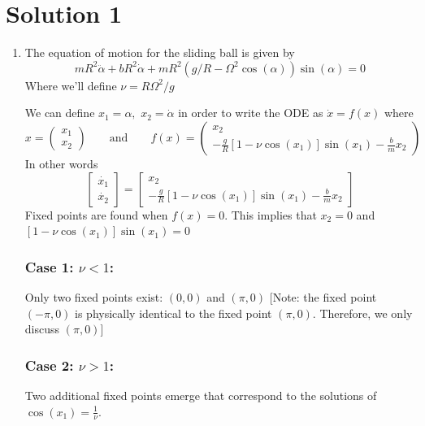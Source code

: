 \documentclass[twoside,10pt,a4paper]{article}
\begin{document}
\section*{Solution 1}
\begin{enumerate}[label=(\alph*)]
\item The equation of motion for the sliding ball is given by
\begin{equation*}
	mR^2 \ddot{\alpha} + bR^2 \dot{\alpha} + mR^2(g/R - \Omega^2 \cos (\alpha))\sin (\alpha) = 0
\end{equation*}
Where we'll define $\nu = R\Omega^2 /g$

We can define $x_1 = \alpha, \,\, x_2 = \dot{\alpha}$ in order to write the ODE as $\dot{x} = f(x)$ where
\begin{equation*}
	x = \begin{pmatrix}
		x_1 \\
		x_2
	\end{pmatrix}
	\qquad \text{and} \qquad f(x) = \begin{pmatrix}
		x_2 \\
		-\displaystyle \frac{g}{R}[1-\nu \cos (x_1)]\sin (x_1) - \frac{b}{m} x_2
	\end{pmatrix}
\end{equation*}
In other words
\begin{equation*}
	\begin{bmatrix}
		\dot{x_1} \\
		\dot{x_2}
	\end{bmatrix} = \begin{bmatrix}
		x_2 \\
		-\displaystyle \frac{g}{R}[1-\nu \cos (x_1)]\sin (x_1) - \frac{b}{m} x_2
	\end{bmatrix}
\end{equation*}
Fixed points are found when $f(x)=0$. This implies that $ x_2 =0$ and $[1-\nu \cos (x_1)]\sin (x_1)=0$

\subsubsection*{Case 1: $\nu <1$:}
Only two fixed points exist: $(0,0)$ and $(\pi,0)$ [Note: the fixed point $(-\pi,0)$ is physically identical to the fixed point $(\pi,0)$. Therefore, we only discuss $(\pi,0)$]

\subsubsection*{Case 2: $\nu >1$:}
Two additional fixed points emerge that correspond to the solutions of $\cos(x_1) = \frac{1}{\nu}$.


\end{enumerate}
\end{document}
